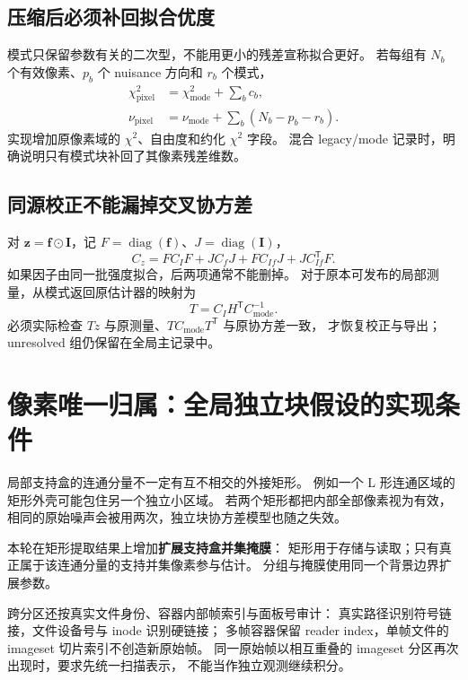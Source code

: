 \documentclass[UTF8,11pt,a4paper,fontset=fandol]{ctexart}
\newcommand{\diag}{\operatorname{diag}}
\newcommand{\T}{^{\mathsf T}}
\begin{document}
\subsection{压缩后必须补回拟合优度}

模式只保留参数有关的二次型，不能用更小的残差宣称拟合更好。
若每组有 $N_b$ 个有效像素、$p_b$ 个 nuisance 方向和 $r_b$ 个模式，
\begin{align}
\chi^2_{\mathrm{pixel}}&=\chi^2_{\mathrm{mode}}+\sum_b c_b,\\
\nu_{\mathrm{pixel}}&=\nu_{\mathrm{mode}}+
\sum_b(N_b-p_b-r_b).
\end{align}
实现增加原像素域的 $\chi^2$、自由度和约化 $\chi^2$ 字段。
混合 legacy/mode 记录时，明确说明只有模式块补回了其像素残差维数。

\subsection{同源校正不能漏掉交叉协方差}

对 $\bm z=\bm f\odot\bm I$，记 $F=\diag(\bm f)$、$J=\diag(\bm I)$，
\begin{equation}
C_z=FC_IF+JC_fJ+FC_{If}J+JC_{If}\T F.
\end{equation}
如果因子由同一批强度拟合，后两项通常不能删掉。
对于原本可发布的局部测量，从模式返回原估计器的映射为
\begin{equation}
T=C_IH\T C_{\mathrm{mode}}^{-1}.
\end{equation}
必须实际检查 $Tz$ 与原测量、$TC_{\mathrm{mode}}T\T$ 与原协方差一致，
才恢复校正与导出；unresolved 组仍保留在全局主记录中。

\section{像素唯一归属：全局独立块假设的实现条件}

局部支持盒的连通分量不一定有互不相交的外接矩形。
例如一个 L 形连通区域的矩形外壳可能包住另一个独立小区域。
若两个矩形都把内部全部像素视为有效，
相同的原始噪声会被用两次，独立块协方差模型也随之失效。

本轮在矩形提取结果上增加\textbf{扩展支持盒并集掩膜}：
矩形用于存储与读取；只有真正属于该连通分量的支持并集像素参与估计。
分组与掩膜使用同一个背景边界扩展参数。

跨分区还按真实文件身份、容器内部帧索引与面板号审计：
真实路径识别符号链接，文件设备号与 inode 识别硬链接；
多帧容器保留 reader index，单帧文件的 imageset 切片索引不创造新原始帧。
同一原始帧以相互重叠的 imageset 分区再次出现时，要求先统一扫描表示，
不能当作独立观测继续积分。
\end{document}
